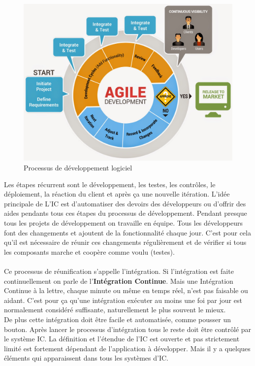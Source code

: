 \begin{figure}[H]
	\centering
		\includegraphics[scale=0.25]{bilder/agile_methodology}
	\caption{Processus de développement logiciel}
	\label{fig:processus}
\end{figure}

Les étapes récurrent sont le développement, les testes, les contrôles, le déploiement, la réaction du client et après ça une nouvelle itération. L'idée principale de L'IC est d'automatiser des devoirs des développeurs ou d'offrir des aides pendants tous ces étapes du processus de développement.
Pendant presque tous les projets de développement on travaille en équipe. Tous les développeurs font des changements et ajoutent de la fonctionnalité chaque jour. C'est pour cela qu'il est nécessaire de réunir ces changements régulièrement et de vérifier si tous les composants marche et coopère comme voulu (testes).\\\\
Ce processus de réunification s'appelle l'intégration. Si l'intégration est faite continuellement on parle de l'\textbf{Intégration Continue}. Mais une Intégration Continue à la lettre, chaque minute ou même en temps réel, n'est pas faisable ou aidant. C'est pour ça qu'une intégration exécuter au moins une foi par jour est normalement considéré suffisante, naturellement le plus souvent le mieux.\\
De plus cette intégration doit être facile et automatisée, comme pousser un bouton. Après lancer le processus d'intégration tous le reste doit être contrôlé par le système IC. La définition et l'étendue de l'IC est ouverte et pas strictement limité est fortement dépendant de l'application à développer. Mais il y a quelques éléments qui apparaissent dans tous les systèmes d'IC.
\newpage

